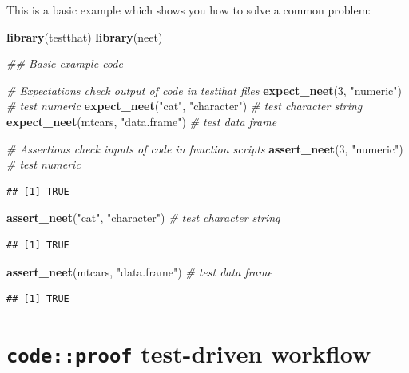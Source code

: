\documentclass[
]{article}
\newenvironment{Shaded}{\begin{snugshade}}{\end{snugshade}}
\newcommand{\CommentTok}[1]{\textcolor[rgb]{0.56,0.35,0.01}{\textit{#1}}}
\newcommand{\DecValTok}[1]{\textcolor[rgb]{0.00,0.00,0.81}{#1}}
\newcommand{\KeywordTok}[1]{\textcolor[rgb]{0.13,0.29,0.53}{\textbf{#1}}}
\newcommand{\NormalTok}[1]{#1}
\newcommand{\StringTok}[1]{\textcolor[rgb]{0.31,0.60,0.02}{#1}}
\begin{document}
This is a basic example which shows you how to solve a common problem:

\begin{Shaded}
\begin{Highlighting}[]
\KeywordTok{library}\NormalTok{(testthat)}
\KeywordTok{library}\NormalTok{(neet)}

\CommentTok{\#\# Basic example code}

\CommentTok{\# Expectations check output of code in testthat files}
\KeywordTok{expect\_neet}\NormalTok{(}\DecValTok{3}\NormalTok{, }\StringTok{"numeric"}\NormalTok{) }\CommentTok{\# test numeric}
\KeywordTok{expect\_neet}\NormalTok{(}\StringTok{"cat"}\NormalTok{, }\StringTok{"character"}\NormalTok{) }\CommentTok{\# test character string}
\KeywordTok{expect\_neet}\NormalTok{(mtcars, }\StringTok{"data.frame"}\NormalTok{) }\CommentTok{\# test data frame}

\CommentTok{\# Assertions check inputs of code in function scripts}
\KeywordTok{assert\_neet}\NormalTok{(}\DecValTok{3}\NormalTok{, }\StringTok{"numeric"}\NormalTok{) }\CommentTok{\# test numeric}
\end{Highlighting}
\end{Shaded}

\begin{verbatim}
## [1] TRUE
\end{verbatim}

\begin{Shaded}
\begin{Highlighting}[]
\KeywordTok{assert\_neet}\NormalTok{(}\StringTok{"cat"}\NormalTok{, }\StringTok{"character"}\NormalTok{) }\CommentTok{\# test character string}
\end{Highlighting}
\end{Shaded}

\begin{verbatim}
## [1] TRUE
\end{verbatim}

\begin{Shaded}
\begin{Highlighting}[]
\KeywordTok{assert\_neet}\NormalTok{(mtcars, }\StringTok{"data.frame"}\NormalTok{) }\CommentTok{\# test data frame}
\end{Highlighting}
\end{Shaded}

\begin{verbatim}
## [1] TRUE
\end{verbatim}

\hypertarget{codeproof-test-driven-workflow}{%
\section{\texorpdfstring{\texttt{code::proof} test-driven workflow}{code::proof test-driven workflow}}\label{codeproof-test-driven-workflow}}
\end{document}
